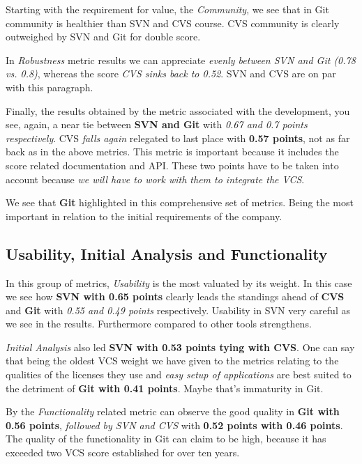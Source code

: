 \documentclass[11pt]{scrartcl}
\begin{document}
\par Starting with the requirement for value, the \emph{Community}, we see that in Git community is healthier than SVN and CVS course. CVS community is clearly outweighed by SVN and Git for double score.

\par In \emph{Robustness} metric results we ​​can appreciate \emph{evenly between SVN and Git (0.78 vs. 0.8)}, whereas the score \emph{CVS sinks back to 0.52}. SVN and CVS are on par with this paragraph.

\par Finally, the results obtained by the metric associated with the development, you see, again, a near tie between \textbf{SVN and Git} with \emph{0.67 and 0.7 points respectively}. CVS \emph{falls again} relegated to last place with \textbf{0.57 points}, not as far back as in the above metrics. This metric is important because it includes the score related documentation and API. These two points have to be taken into account because \emph{we will have to work with them to integrate the VCS}.

\par We see that \textbf{Git} highlighted in this comprehensive set of metrics. Being the most important in relation to the initial requirements of the company.

\subsection{Usability, Initial Analysis and Functionality}

\par In this group of metrics, \emph{Usability} is the most valuated by its weight. In this case we see how \textbf{SVN with 0.65 points} clearly leads the standings ahead of \textbf{CVS} and \textbf{Git} with \emph{0.55 and 0.49 points} respectively. Usability in SVN very careful as we see in the results. Furthermore compared to other tools strengthens.

\par \emph{Initial Analysis} also led \textbf{SVN with 0.53 points tying with CVS}. One can say that being the oldest VCS weight we have given to the metrics relating to the qualities of the licenses they use and \emph{easy setup of applications} are best suited to the detriment of \textbf{Git with 0.41 points}. Maybe that's immaturity in Git.

\par By the \emph{Functionality} related metric can observe the good quality in \textbf{Git with 0.56 points}, \emph{followed by SVN and CVS} with \textbf{0.52 points with 0.46 points}. The quality of the functionality in Git can claim to be high, because it has exceeded two VCS score established for over ten years.
\end{document}
